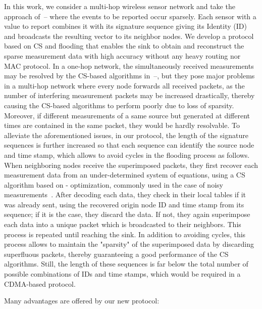 \documentclass[letterpaper,conference]{IEEEtran}
\begin{document}
In this work, we consider a multi-hop wireless sensor network and take the approach of~\cite{Men09mar}--\cite{Bha09jun} where the events to be reported occur sparsely. Each sensor with a value to report combines it with its signature sequence giving its Identity (ID) and broadcasts the resulting vector to its neighbor nodes. We develop a protocol based on CS and flooding that enables the sink to obtain and reconstruct the sparse measurement data with high accuracy without any heavy routing nor MAC protocol. In a one-hop network, the simultaneously received measurements may be resolved by the CS-based algorithms in~\cite{Men09mar}--\cite{Bha09jun}, but they pose major problems in a multi-hop network where every node forwards all received packets, as the number of interfering measurement packets may be increased drastically, thereby causing the CS-based algorithms to perform poorly due to loss of sparsity. Moreover, if different measurements of a same source but generated at different times are contained in the same packet, they would be hardly resolvable.
To alleviate the aforementioned issues, in our protocol, the length of the signature sequences is further increased so that each sequence can identify the source node and time stamp, which allows to avoid cycles in the flooding process as follows. When neighboring nodes receive the superimposed packets, they first recover each measurement data from an under-determined system of equations, using a CS algorithm based on - optimization, commonly used in the case of noisy measurements~\cite{Elad10}. After decoding each data, they check in their local tables if it was already sent, using the recovered origin node ID and time stamp from its sequence; if it is the case, they discard the data. If not, they again superimpose each data into a unique packet which is broadcasted to their neighbors. This process is repeated until reaching the sink. In addition to avoiding cycles, this process allows to maintain the "sparsity" of the superimposed data by discarding superfluous packets, thereby guaranteeing a good performance of the CS algorithms. Still, the length of these sequences is far below the total number of possible combinations of IDs and time stamps, which would be required in a CDMA-based protocol.

Many advantages are offered by our new protocol:
\end{document}
